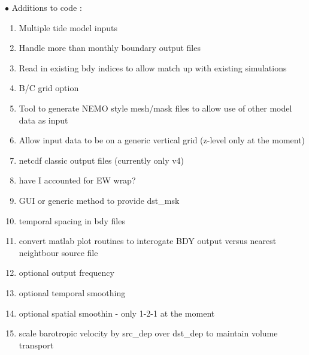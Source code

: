 $\bullet$ Additions to code :\\
\begin{enumerate}
\item Multiple tide model inputs
\item Handle more than monthly boundary output files
\item Read in existing bdy indices to allow match up with existing simulations
\item B/C grid option
\item Tool to generate NEMO style mesh/mask files to allow use of other model
      data as input
\item Allow input data to be on a generic vertical grid (z-level only at the moment)
\item netcdf classic output files (currently only v4)
\item have I accounted for EW wrap?
\item GUI or generic method to provide dst\_msk
\item temporal spacing in bdy files 
\item convert matlab plot routines to interogate BDY output versus nearest neightbour 
      source file
\item optional output frequency
\item optional temporal smoothing
\item optional spatial smoothin - only 1-2-1 at the moment
\item scale barotropic velocity by src\_dep over dst\_dep to maintain volume transport
\end{enumerate}

